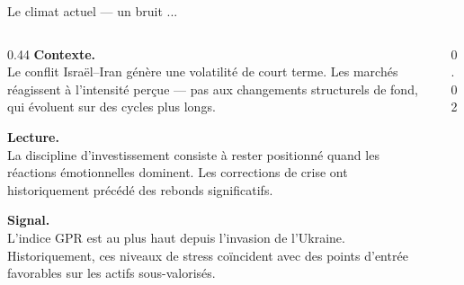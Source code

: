 \documentclass[aspectratio=169,9pt]{beamer}
\newcommand{\kw}[1]{{\color{navy}\footnotesize\bfseries #1}\\[3pt]}
\begin{document}
\begin{frame}{Le climat actuel — un bruit ...}
\begin{columns}[T,totalwidth=\textwidth]

\begin{column}{0.44\textwidth}
\vspace{6pt}
\kw{Contexte.}
{\small Le conflit Israël–Iran génère une volatilité de court terme. Les
marchés réagissent à l'intensité perçue — pas aux changements structurels
de fond, qui évoluent sur des cycles plus longs.}

\vspace{6pt}
\kw{Lecture.}
{\small La discipline d'investissement consiste à rester positionné
quand les réactions émotionnelles dominent. Les corrections de crise
ont historiquement précédé des rebonds significatifs.}

\vspace{6pt}
\kw{Signal.}
{\small L'indice GPR est au plus haut depuis l'invasion de l'Ukraine.
Historiquement, ces niveaux de stress coïncident avec des points d'entrée
favorables sur les actifs sous-valorisés.}
\end{column}

\begin{column}{0.02\textwidth}\end{column}


\end{columns}
\end{frame}
\end{document}
